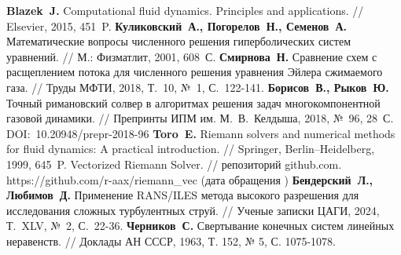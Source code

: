 \begin{thebibliography}{99}
\textbf{Blazek~J.} Computational fluid dynamics. Principles and applications. // Elsevier, 2015, 451~P.
\textbf{Куликовский~А., Погорелов~Н., Семенов~А.} Математические вопросы численного решения гиперболических систем уравнений. // М.: Физматлит, 2001, 608~С.
\textbf{Смирнова~Н.} Сравнение схем с расщеплением потока для численного решения уравнения Эйлера сжимаемого газа. // Труды МФТИ, 2018, Т.~10, №~1, С.~122-141.
\textbf{Борисов~В., Рыков~Ю.} Точный римановский солвер в алгоритмах решения задач многокомпонентной газовой динамики. // Препринты ИПМ им. М.~В.~Келдыша, 2018, №~96, 28~С. DOI:~10.20948/prepr-2018-96
\textbf{Toro~E.} Riemann solvers and numerical methods for fluid dynamics: A practical introduction. // Springer, Berlin–Heidelberg, 1999, 645~P.
Vectorized Riemann Solver. // репозиторий github.com. https://github.com/r-aax/riemann\_vec (дата обращения \StrDate)
\textbf{Бендерский~Л., Любимов~Д.} Применение RANS/ILES метода высокого разрешения для исследования сложных турбулентных струй. // Ученые записки ЦАГИ, 2024, Т.~XLV, №~2, С.~22-36. 
\textbf{Черников~С.} Свертывание конечных систем линейных неравенств. // Доклады АН СССР, 1963, Т. 152, № 5, С. 1075-1078.


\end{thebibliography}
